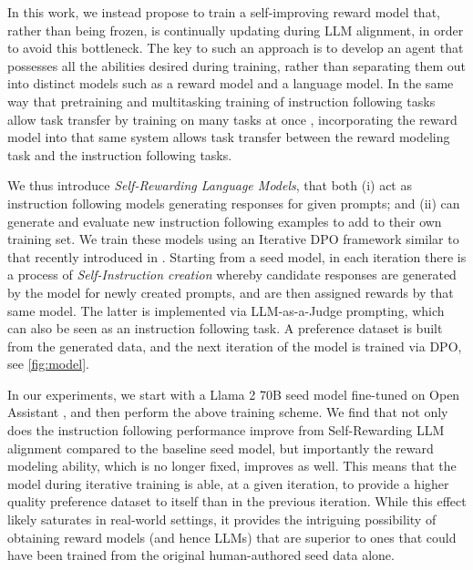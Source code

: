 \documentclass{article}
\begin{document}
In this work, we instead
propose to train a self-improving reward model
that, rather than being frozen,  is continually updating during LLM alignment, in order to avoid this bottleneck. 
The key to such an approach is to develop an agent that possesses all the abilities desired during training, rather than separating them out into distinct models such as a reward model and a language model. 
In the same way that pretraining and 
multitasking training of instruction following tasks
allow task transfer by training on many tasks at once 
\citep{collobert2008unified,radford2019language,ouyang2022training}, incorporating the reward model into that same system allows task transfer between the reward modeling task and the instruction following tasks.

We thus introduce {\em Self-Rewarding Language Models}, that both (i) act as instruction following models generating responses for given prompts; and (ii) can generate and evaluate new instruction following examples to add to their own training set. We train these models using an Iterative DPO framework similar to that recently introduced in \citet{xu2023some}. Starting from a seed model,  in each iteration there is a process of {\em Self-Instruction creation} whereby candidate responses are generated by the model for newly created prompts, and  are then assigned rewards by that same model. The latter is implemented via LLM-as-a-Judge prompting, which can also be seen as an instruction following task. A preference dataset is built from the generated data, and the next iteration of the model is trained via DPO, see
 \autoref{fig:model}.

In our experiments,  we start with a Llama 2 70B \citep{touvron2023llama2} seed model fine-tuned on  Open Assistant \citep{kopf2023openassistant}, and then perform the above training scheme.
We find that not only does the instruction following performance improve from Self-Rewarding LLM alignment compared to the baseline seed model, but importantly
the reward modeling ability, which is no longer fixed, improves as well. 
This means that the model during iterative training is able, at a given iteration, to provide a higher quality preference dataset to itself than in the previous iteration.
While this effect likely saturates in real-world settings, it provides the intriguing possibility of obtaining reward models (and hence LLMs) that are superior to ones that could have been trained from the original human-authored seed data alone.
\end{document}
